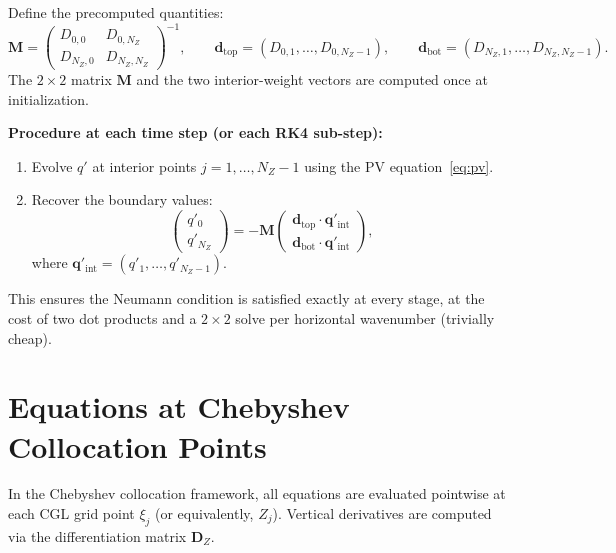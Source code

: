\documentclass[11pt]{article}
\newcommand{\Dvec}{\bm{D}}
\begin{document}
Define the precomputed quantities:
\begin{equation}
\bm{M} = \begin{pmatrix} D_{0,0} & D_{0,N_Z} \\ D_{N_Z,0} & D_{N_Z,N_Z} \end{pmatrix}^{-1}, \qquad
\bm{d}_{\mathrm{top}} = (D_{0,1}, \ldots, D_{0,N_Z-1}), \qquad
\bm{d}_{\mathrm{bot}} = (D_{N_Z,1}, \ldots, D_{N_Z,N_Z-1}).
\label{eq:neumann_precompute}
\end{equation}
The $2\times 2$ matrix $\bm{M}$ and the two interior-weight vectors are computed once at initialization.

\textbf{Procedure at each time step (or each RK4 sub-step):}
\begin{enumerate}[nosep]
\item Evolve $q'$ at interior points $j = 1, \ldots, N_Z - 1$ using the PV equation~\eqref{eq:pv}.
\item Recover the boundary values:
\begin{equation}
\begin{pmatrix} q'_0 \\ q'_{N_Z} \end{pmatrix} = -\bm{M}\begin{pmatrix} \bm{d}_{\mathrm{top}} \cdot \bm{q}'_{\mathrm{int}} \\ \bm{d}_{\mathrm{bot}} \cdot \bm{q}'_{\mathrm{int}} \end{pmatrix},
\end{equation}
where $\bm{q}'_{\mathrm{int}} = (q'_1, \ldots, q'_{N_Z-1})$.
\end{enumerate}

This ensures the Neumann condition is satisfied exactly at every stage, at the cost of two dot products and a $2\times 2$ solve per horizontal wavenumber (trivially cheap).



\section{Equations at Chebyshev Collocation Points}
\label{sec:equations_collocation}

In the Chebyshev collocation framework, all equations are evaluated pointwise at each CGL grid point $\xi_j$ (or equivalently, $Z_j$). Vertical derivatives are computed via the differentiation matrix $\Dvec_Z$.
\end{document}
